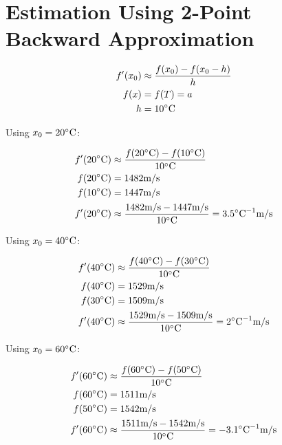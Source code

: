 \section{Estimation Using 2-Point Backward Approximation}
	\begin{align}
		f'(x_{0})&\approx \frac{f(x_{0})-f(x_{0}-h)}{h}& \\
		f(x) &= f(T) = a& \\
		h &= 10 \degree \text{C}&
	\end{align}

	Using $x_{0} = 20 \degree \text{C}$:

	\begin{align}
		f'(20\degree \text{C})&\approx \frac{f(20\degree \text{C})-f(10\degree \text{C})}{10\degree \text{C}}& \\
		f(20\degree \text{C}) &= 1482 \text{m/s}&\\
		f(10\degree \text{C}) &= 1447 \text{m/s}& \\
		f'(20\degree \text{C})&\approx \frac{1482 \text{m/s} - 1447 \text{m/s} }{10 \degree \text{C}} = 3.5\degree \text{C}^{-1}\text{m/s}&
	\end{align}

	Using $x_{0} = 40 \degree \text{C}$:

	\begin{align}
		f'(40\degree \text{C})&\approx \frac{f(40\degree \text{C})-f(30\degree \text{C})}{10\degree \text{C}}& \\
		f(40\degree \text{C}) &= 1529 \text{m/s}& \\
		f(30\degree \text{C}) &= 1509 \text{m/s}& \\
		f'(40\degree \text{C})&\approx \frac{1529 \text{m/s} - 1509 \text{m/s} }{10\degree \text{C}} = 2\degree \text{C}^{-1}\text{m/s}&
	\end{align}

	Using $x_{0} = 60 \degree \text{C}$:

	\begin{align}
		f'(60\degree \text{C})&\approx \frac{f(60\degree \text{C})-f(50\degree \text{C})}{10\degree \text{C}}& \\
		f(60\degree \text{C}) &= 1511 \text{m/s}& \\
		f(50\degree \text{C}) &= 1542 \text{m/s}& \\
		f'(60\degree \text{C})&\approx \frac{1511 \text{m/s}- 1542 \text{m/s} }{10\degree \text{C}} = -3.1\degree \text{C}^{-1}\text{m/s}&
	\end{align}
